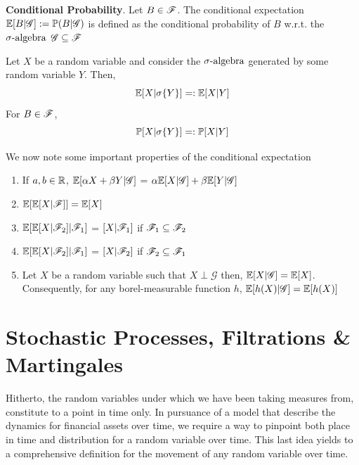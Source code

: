 \documentclass[../TGMAFFIRO.tex]{subfiles}
\begin{document}
\begin{definition}\textbf{Conditional Probability}.
	Let $B\in\mathscr{F}$. The conditional expectation $\mathbb{E}[B | \mathscr{G}] := \mathbb{P}(B | \mathscr{G})$ is defined as the conditional probability of $B$ w.r.t. the $\sigma\text{-algebra}$ $\mathscr{G} \subseteq \mathscr{F}$
\end{definition}


\begin{definition}
	Let $X$ be a random variable and consider the $\sigma\text{-algebra}$ generated by some random variable $Y$. Then,
	\begin{equation}
		\mathbb{E}[X | \sigma\{Y\}] =: \mathbb{E}[X | Y]
	\end{equation}
	For $B \in \mathscr{F}$,
	\begin{equation}
		\mathbb{P}[X | \sigma\{Y\}] =: \mathbb{P}[X | Y]
	\end{equation}
\end{definition}

\begin{proposition}
	We now note some important properties of the conditional expectation
	\begin{enumerate}
		\item If $a, b \in \mathbb{R}$, $\mathbb{E}[\alpha X + \beta Y | \mathscr{G}]$ = $\alpha \mathbb{E}[X | \mathscr{G}] + \beta\mathbb{E}[Y | \mathscr{G}]$
		\item $\mathbb{E}[\mathbb{E}[X | \mathscr{F}]] = \mathbb{E}[X]$
		\item $\mathbb{E}[\mathbb{E}[X | \mathscr{F}_2] | \mathscr{F}_1]$ = $[X | \mathscr{F}_1]$ if $\mathscr{F}_1 \subseteq \mathscr{F}_2$
		\item $\mathbb{E}[\mathbb{E}[X | \mathscr{F}_2] | \mathscr{F}_1]$ = $[X | \mathscr{F}_2]$ if $\mathscr{F}_2 \subseteq \mathscr{F}_1$
		\item Let $X$ be a random variable such that $X \perp \mathscr{G}$ then, $\mathbb{E}[X|\mathscr{G}] = \mathbb{E}[X]$. Consequently, for any borel-measurable function $h$, $\mathbb{E}[h(X)|\mathscr{G}] = \mathbb{E}[h(X)]$
	\end{enumerate}
\end{proposition}


\section{Stochastic Processes, Filtrations \& Martingales}
Hitherto, the random variables under which we have been taking measures from, constitute to a point in time only. In pursuance of a model that describe the dynamics for financial assets over time, we require a way to pinpoint both place in time and distribution for a random variable over time. This last idea yields to a comprehensive definition for the movement of any random variable over time.
\end{document}
